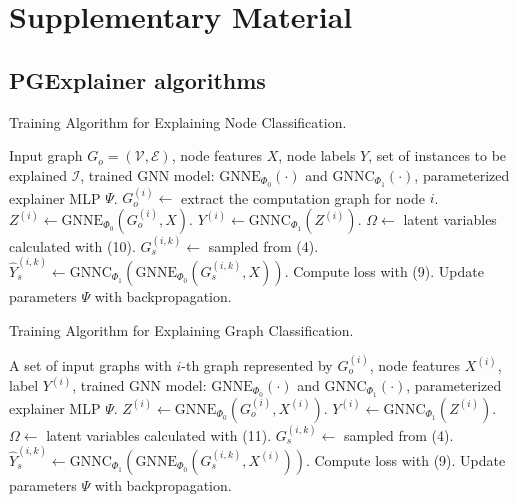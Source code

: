 \chapter{Supplementary Material}

\section{PGExplainer algorithms}

\begin{algorithm}
    \caption{Training Algorithm for Explaining Node Classification.}
    \begin{algorithmic}[1]
    \REQUIRE Input graph $G_o = (\mathcal{V}, \mathcal{E})$, node features $X$, node labels $Y$, set of instances to be explained $\mathcal{I}$, trained GNN model: $\text{GNNE}_{\Phi_0}(\cdot)$ and $\text{GNNC}_{\Phi_1}(\cdot)$, parameterized explainer MLP $\Psi$.
        \STATE $G^{(i)}_o \leftarrow$ extract the computation graph for node $i$.
        \STATE $Z^{(i)} \leftarrow \text{GNNE}_{\Phi_0}(G^{(i)}_o, X)$.
        \STATE $Y^{(i)} \leftarrow \text{GNNC}_{\Phi_1}(Z^{(i)})$.
    \ENDFOR
            \STATE $\Omega \leftarrow$ latent variables calculated with (10).
                \STATE $G^{(i,k)}_s \leftarrow$ sampled from (4).
                \STATE $\hat{Y}^{(i,k)}_s \leftarrow \text{GNNC}_{\Phi_1}(\text{GNNE}_{\Phi_0}(G^{(i,k)}_s, X))$.
            \ENDFOR
        \ENDFOR
        \STATE Compute loss with (9).
        \STATE Update parameters $\Psi$ with backpropagation.
    \ENDFOR
    \end{algorithmic}
    \end{algorithm}
    
    \vspace{0.5cm}
    
    \begin{algorithm}
    \caption{Training Algorithm for Explaining Graph Classification.}
    \begin{algorithmic}[1]
    \REQUIRE A set of input graphs with $i$-th graph represented by $G^{(i)}_o$, node features $X^{(i)}$, label $Y^{(i)}$, trained GNN model: $\text{GNNE}_{\Phi_0}(\cdot)$ and $\text{GNNC}_{\Phi_1}(\cdot)$, parameterized explainer MLP $\Psi$.
        \STATE $Z^{(i)} \leftarrow \text{GNNE}_{\Phi_0}(G^{(i)}_o, X^{(i)})$.
        \STATE $Y^{(i)} \leftarrow \text{GNNC}_{\Phi_1}(Z^{(i)})$.
    \ENDFOR
            \STATE $\Omega \leftarrow$ latent variables calculated with (11).
                \STATE $G^{(i,k)}_s \leftarrow$ sampled from (4).
                \STATE $\hat{Y}^{(i,k)}_s \leftarrow \text{GNNC}_{\Phi_1}(\text{GNNE}_{\Phi_0}(G^{(i,k)}_s, X^{(i)}))$.
            \ENDFOR
        \ENDFOR
        \STATE Compute loss with (9).
        \STATE Update parameters $\Psi$ with backpropagation.
    \ENDFOR
    \end{algorithmic}
\end{algorithm}

